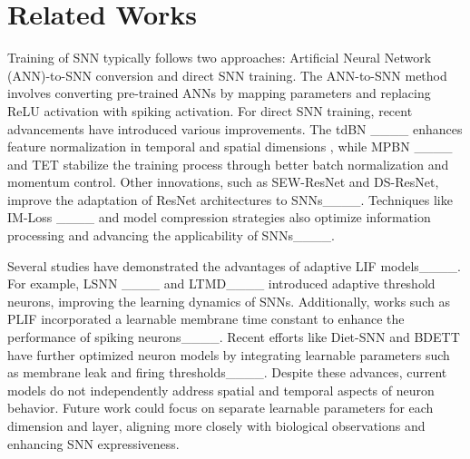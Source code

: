 \section{Related Works}
Training of SNN typically follows two approaches: Artificial Neural Network (ANN)-to-SNN conversion and direct SNN training. The ANN-to-SNN method involves converting pre-trained ANNs by mapping parameters and replacing ReLU activation with spiking activation. 
For direct SNN training, recent advancements have introduced various improvements. The tdBN ____ enhances feature normalization in temporal and spatial dimensions , while MPBN ____ and TET stabilize the training process through better batch normalization and momentum control. 
Other innovations, such as SEW-ResNet and DS-ResNet, improve the adaptation of ResNet architectures to SNNs____. 
Techniques like IM-Loss ____ and model compression strategies also optimize information processing and advancing the applicability of SNNs____.

Several studies have demonstrated the advantages of adaptive LIF models____. For example, LSNN ____ and LTMD____ introduced adaptive threshold neurons, improving the learning dynamics of SNNs. Additionally, works such as PLIF incorporated a learnable membrane time constant to enhance the performance of spiking neurons____. Recent efforts like Diet-SNN and BDETT have further optimized neuron models by integrating learnable parameters such as membrane leak and firing thresholds____.
Despite these advances, current models do not independently address spatial and temporal aspects of neuron behavior. Future work could focus on separate learnable parameters for each dimension and layer, aligning more closely with biological observations and enhancing SNN expressiveness.